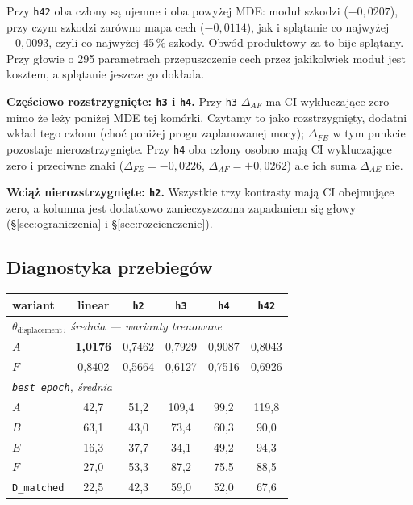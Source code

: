 \documentclass[11pt, a4paper]{article}
\begin{document}
Przy \texttt{h42} oba człony są ujemne i oba powyżej MDE: moduł szkodzi ($-0{,}0207$), przy czym szkodzi zarówno mapa cech ($-0{,}0114$), jak i splątanie co najwyżej $-0{,}0093$, czyli co najwyżej 45\,\% szkody. Obwód produktowy za to bije splątany. Przy głowie o 295 parametrach przepuszczenie cech przez jakikolwiek moduł jest kosztem, a splątanie jeszcze go dokłada.

\textbf{Częściowo rozstrzygnięte: \texttt{h3} i \texttt{h4}.} Przy \texttt{h3} $\Delta_{AF}$ ma CI wykluczające zero mimo że leży poniżej MDE tej komórki. Czytamy to jako rozstrzygnięty, dodatni wkład tego członu (choć poniżej progu zaplanowanej mocy); $\Delta_{FE}$ w tym punkcie pozostaje nierozstrzygnięte. Przy \texttt{h4} oba człony osobno mają CI wykluczające zero i przeciwne znaki ($\Delta_{FE}=-0{,}0226$, $\Delta_{AF}=+0{,}0262$) ale ich suma $\Delta_{AE}$ nie.

\textbf{Wciąż nierozstrzygnięte: \texttt{h2}.} Wszystkie trzy kontrasty mają CI obejmujące zero, a kolumna jest dodatkowo zanieczyszczona zapadaniem się głowy (\S\ref{sec:ograniczenia} i \S\ref{sec:rozcienczenie}).

\subsection{Diagnostyka przebiegów}\label{sec:ruch}

\begin{table}[H]
\centering
\renewcommand{\arraystretch}{1.3}
\begin{tabular}{lccccc}
\toprule
\textbf{wariant} & \textbf{linear} & \texttt{h2} & \texttt{h3} & \texttt{h4} & \texttt{h42} \\
\midrule
\multicolumn{6}{l}{\emph{$\theta_{\text{displacement}}$, średnia --- warianty trenowane}} \\
$A$ & \textbf{1,0176} & 0,7462 & 0,7929 & 0,9087 & 0,8043 \\
$F$ & 0,8402 & 0,5664 & 0,6127 & 0,7516 & 0,6926 \\
\midrule
\multicolumn{6}{l}{\emph{\texttt{best\_epoch}, średnia}} \\
$A$ & 42,7 & 51,2 & 109,4 & 99,2 & 119,8 \\
$B$ & 63,1 & 43,0 & 73,4 & 60,3 & 90,0 \\
$E$ & 16,3 & 37,7 & 34,1 & 49,2 & 94,3 \\
$F$ & 27,0 & 53,3 & 87,2 & 75,5 & 88,5 \\
\texttt{D\_matched} & 22,5 & 42,3 & 59,0 & 52,0 & 67,6 \\
\bottomrule
\end{tabular}
\end{table}
\end{document}
